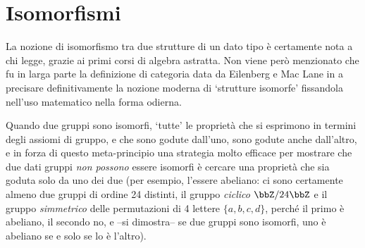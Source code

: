 \section{Isomorfismi}\label{sec_isomorfismi}
La nozione di isomorfismo tra due strutture di un dato tipo è certamente nota a chi legge, grazie ai primi corsi di algebra astratta. Non viene però menzionato che fu in larga parte la definizione di categoria data da Eilenberg e Mac Lane in \cite{gtone} a precisare definitivamente la nozione moderna di `strutture isomorfe' fissandola nell'uso matematico nella forma odierna.

Quando due gruppi sono isomorfi, `tutte' le proprietà che si esprimono in termini degli assiomi di gruppo, e che sono godute dall'uno, sono godute anche dall'altro, e in forza di questo meta-principio una strategia molto efficace per mostrare che due dati gruppi \emph{non possono} essere isomorfi è cercare una proprietà che sia goduta solo da uno dei due (per esempio, l'essere abeliano: ci sono certamente almeno due gruppi di ordine 24 distinti, il gruppo \emph{ciclico} \(\bbZ/24\bbZ\) e il gruppo \emph{simmetrico} delle permutazioni di 4 lettere \(\{a,b,c,d\}\), perché il primo è abeliano, il secondo no, e --si dimostra-- se due gruppi sono isomorfi, uno è abeliano se e solo se lo è l'altro).


